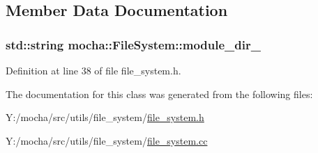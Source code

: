 \subsection{Member Data Documentation}
\hypertarget{classmocha_1_1_file_system_a387837ad143996593d7a66284ab8153a}{
\subsubsection[{module\_\-dir\_\-}]{\setlength{\rightskip}{0pt plus 5cm}std::string {\bf mocha::FileSystem::module\_\-dir\_\-}}}
\label{classmocha_1_1_file_system_a387837ad143996593d7a66284ab8153a}


Definition at line 38 of file file\_\-system.h.



The documentation for this class was generated from the following files:\begin{DoxyCompactItemize}
\item 
Y:/mocha/src/utils/file\_\-system/\hyperlink{file__system_8h}{file\_\-system.h}\item 
Y:/mocha/src/utils/file\_\-system/\hyperlink{file__system_8cc}{file\_\-system.cc}\end{DoxyCompactItemize}
